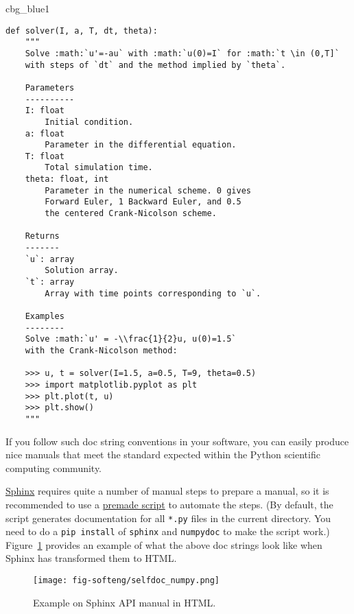 \documentclass[graybox,sectrefs,envcountresetchap,open=right,final]{svmonodo}
\newenvironment{_cod_tight}[1]{
   \def\FrameCommand{\colorbox{#1}}
   \FrameRule0.6pt\MakeFramed {\FrameRestore}\vskip3mm}
   {\vskip0mm\endMakeFramed}
\newenvironment{cod}[1]{
\bgroup\rmfamily
\fboxsep=0mm\relax
\begin{_cod_tight}{#1}
\list{}{\parsep=-2mm\parskip=0mm\topsep=0pt\leftmargin=2mm
\rightmargin=2\leftmargin\leftmargin=4pt\relax}
\item\relax}
{\endlist\end{_cod_tight}\egroup}
\begin{document}
\begin{cod}{cbg_blue1}\begin{Verbatim}[numbers=none,fontsize=\fontsize{9pt}{9pt},baselinestretch=0.95,xleftmargin=2mm]
def solver(I, a, T, dt, theta):
    """
    Solve :math:`u'=-au` with :math:`u(0)=I` for :math:`t \in (0,T]`
    with steps of `dt` and the method implied by `theta`.

    Parameters
    ----------
    I: float
        Initial condition.
    a: float
        Parameter in the differential equation.
    T: float
        Total simulation time.
    theta: float, int
        Parameter in the numerical scheme. 0 gives
        Forward Euler, 1 Backward Euler, and 0.5
        the centered Crank-Nicolson scheme.

    Returns
    -------
    `u`: array
        Solution array.
    `t`: array
        Array with time points corresponding to `u`.

    Examples
    --------
    Solve :math:`u' = -\\frac{1}{2}u, u(0)=1.5`
    with the Crank-Nicolson method:

    >>> u, t = solver(I=1.5, a=0.5, T=9, theta=0.5)
    >>> import matplotlib.pyplot as plt
    >>> plt.plot(t, u)
    >>> plt.show()
    """
\end{Verbatim}
\end{cod}
\noindent
If you follow such doc string conventions in your software, you can
easily produce nice manuals that meet the standard expected within
the Python scientific computing community.


\href{{http://sphinx-doc.org/}}{Sphinx} requires quite a number of manual steps to
prepare a manual, so it is
recommended to use a \href{{http://tinyurl.com/ofkw6kc/softeng/make_sphinx_api.py}}{premade script} to automate the steps. (By default,
the script generates documentation for all \texttt{*.py} files in the
current directory.
You need to do a \texttt{pip install} of \texttt{sphinx} and \texttt{numpydoc} to make the
script work.)
Figure~\ref{softeng1:basic:docstring:fig} provides an example of what
the above doc strings look like when Sphinx has transformed them to HTML.


\begin{figure}[!ht]  %
  \centerline{\texttt{[image: fig-softeng/selfdoc\_numpy.png]}}
  \caption{
  Example on Sphinx API manual in HTML. \label{softeng1:basic:docstring:fig}
  }
\end{figure}
\end{document}
